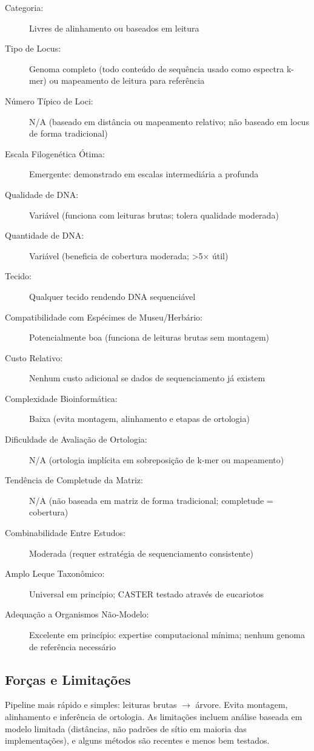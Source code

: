 \begin{description}
\item[Categoria:] Livres de alinhamento ou baseados em leitura
\item[Tipo de Locus:] Genoma completo (todo conteúdo de sequência usado como espectra k-mer) ou mapeamento de leitura para referência
\item[Número Típico de Loci:] N/A (baseado em distância ou mapeamento relativo; não baseado em locus de forma tradicional)
\item[Escala Filogenética Ótima:] Emergente: demonstrado em escalas intermediária a profunda
\item[Qualidade de DNA:] Variável (funciona com leituras brutas; tolera qualidade moderada)
\item[Quantidade de DNA:] Variável (beneficia de cobertura moderada; >5$\times$ útil)
\item[Tecido:] Qualquer tecido rendendo DNA sequenciável
\item[Compatibilidade com Espécimes de Museu/Herbário:] Potencialmente boa (funciona de leituras brutas sem montagem)
\item[Custo Relativo:] Nenhum custo adicional se dados de sequenciamento já existem
\item[Complexidade Bioinformática:] Baixa (evita montagem, alinhamento e etapas de ortologia)
\item[Dificuldade de Avaliação de Ortologia:] N/A (ortologia implícita em sobreposição de k-mer ou mapeamento)
\item[Tendência de Completude da Matriz:] N/A (não baseada em matriz de forma tradicional; completude = cobertura)
\item[Combinabilidade Entre Estudos:] Moderada (requer estratégia de sequenciamento consistente)
\item[Amplo Leque Taxonômico:] Universal em princípio; CASTER testado através de eucariotos
\item[Adequação a Organismos Não-Modelo:] Excelente em princípio: expertise computacional mínima; nenhum genoma de referência necessário
\end{description}

\subsection{Forças e Limitações}

Pipeline mais rápido e simples: leituras brutas $\rightarrow$ árvore. Evita montagem, alinhamento e inferência de ortologia. As limitações incluem análise baseada em modelo limitada (distâncias, não padrões de sítio em maioria das implementações), e alguns métodos são recentes e menos bem testados.

